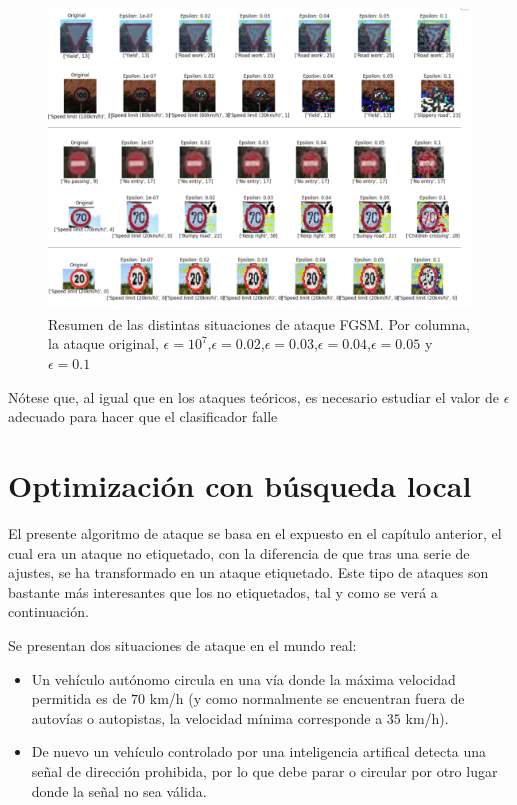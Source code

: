 \begin{figure}[H]
    \centering
        \centering
        \includegraphics[width=\textwidth]{img/tabla_resumen_fgsm.png}
        \caption{Resumen de las distintas situaciones de ataque FGSM. Por columna, la ataque original, $\epsilon=10^{7}$,$\epsilon=0.02$,$\epsilon=0.03$,$\epsilon=0.04$,$\epsilon=0.05$ y $\epsilon=0.1$}
        \label{fig:tablaresumentfgsm}
\end{figure}

Nótese que, al igual que en los ataques teóricos, es necesario estudiar el valor de $\epsilon$ adecuado para hacer que el clasificador falle

\section{Optimización con búsqueda local}

El presente algoritmo de ataque se basa en el expuesto en el capítulo anterior, el cual era un ataque no etiquetado, con la diferencia de que tras una serie de ajustes, se ha transformado en un ataque etiquetado. Este tipo de ataques son bastante más interesantes que los no etiquetados, tal y como se verá a continuación.

Se presentan dos situaciones de ataque en el mundo real:

\begin{itemize}
    \item Un vehículo autónomo circula en una vía donde la máxima velocidad permitida es de $70$ km/h (y como normalmente se encuentran fuera de autovías o autopistas, la velocidad mínima corresponde a $35$ km/h).

    \item De nuevo un vehículo controlado por una inteligencia artifical detecta una señal de dirección prohibida, por lo que debe parar o circular por otro lugar donde la señal no sea válida.
\end{itemize}

